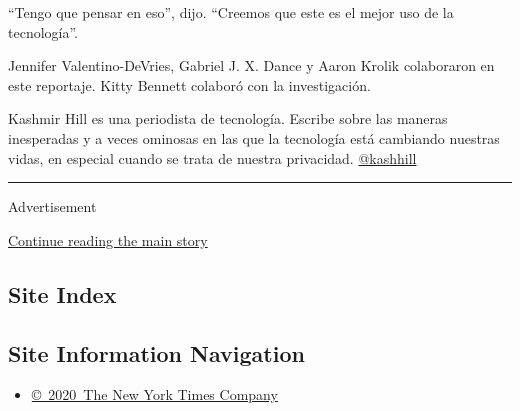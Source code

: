``Tengo que pensar en eso'', dijo. ``Creemos que este es el mejor uso de
la tecnología''.

Jennifer Valentino-DeVries, Gabriel J. X. Dance y Aaron Krolik
colaboraron en este reportaje. Kitty Bennett colaboró con la
investigación.

Kashmir Hill es una periodista de tecnología. Escribe sobre las maneras
inesperadas y a veces ominosas en las que la tecnología está cambiando
nuestras vidas, en especial cuando se trata de nuestra privacidad.
\href{https://twitter.com/kashhill?ref_src=twsrc\%5Egoogle\%7Ctwcamp\%5Eserp\%7Ctwgr\%5Eauthor}{@kashhill}

\begin{center}\rule{0.5\linewidth}{\linethickness}\end{center}

Advertisement

\protect\hyperlink{after-bottom}{Continue reading the main story}

\hypertarget{site-index}{%
\subsection{Site Index}\label{site-index}}

\hypertarget{site-information-navigation}{%
\subsection{Site Information
Navigation}\label{site-information-navigation}}

\begin{itemize}
\tightlist
\item
  \href{https://help.nytimes3xbfgragh.onion/hc/en-us/articles/115014792127-Copyright-notice}{©~2020~The
  New York Times Company}
\end{itemize}

